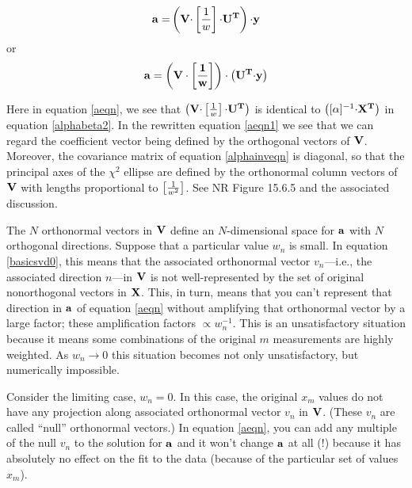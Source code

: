 \documentclass[psfig,preprint]{aastex}
\begin{document}
\begin{mathletters}
\begin{equation} \label{aeqn}
\mathbf{ a = }  \left( \mathbf{V \cdot} \left[ {1 \over w} \right]
\mathbf{ \cdot U^T } \right) \mathbf{\cdot y}
\end{equation}
\noindent or
\begin{equation} \label{aeqn1}
\mathbf{ a =   \left( V \cdot \left[ {1 \over w} \right] \right)
\cdot \left( U^T   \mathbf{\cdot y} \right) }
\end{equation}
\end{mathletters}

\noindent Here in equation \ref{aeqn}, we see that $\left( \mathbf{V
\cdot} \left[ {1 \over w} \right] \mathbf{ \cdot U^T } \right)$ is
identical to $\left( [\alpha]^{-1} {\bf \cdot X^T} \right)$ in equation
\ref{alphabeta2}. In the rewritten equation \ref{aeqn1} we see that we
can regard the coefficient vector being defined by the orthogonal
vectors of $\bf V$. Moreover, the covariance matrix of equation
\ref{alphainveqn} is diagonal, so that the principal axes of the
$\chi^2$ ellipse are defined by the orthonormal column vectors of $\bf
V$ with lengths proportional to $\left[ 1 \over w^2 \right]$. See NR
Figure 15.6.5 and the associated discussion.

The $N$ orthonormal vectors in $\bf V$ define an $N$-dimensional space
for $\bf a$ with $N$ orthogonal directions.  Suppose that a particular value $w_n$
is small. In equation \ref{basicsvd0}, this means that the associated
orthonormal vector $v_n$---i.e., the associated direction $n$---in $\bf V$
is not well-represented by the set of original nonorthogonal vectors in
$\bf X$. This, in turn, means that you can't represent that direction
in $\bf a$ of equation \ref{aeqn} without 
amplifying that orthonormal vector by a large factor; these
amplification factors $\propto w_n^{-1}$. This is an unsatisfactory
situation because it means some combinations of the original $m$
measurements are highly weighted. As $w_n \rightarrow 0$ this situation
becomes not only unsatisfactory, but numerically impossible. 

Consider the limiting case, $w_n=0$.  In this case, the original $x_m$
values do not have any projection along associated orthonormal vector
$v_n$ in $\bf V$. (These $v_n$ are called ``null'' orthonormal vectors.)
In equation \ref{aeqn}, you can add any multiple of the null $v_n$ to
the solution for $\bf a$ and it won't change $\bf a$ at all (!) because
it has absolutely no effect on the fit to the data (because of the
particular set of values $x_m$).
\end{document}
